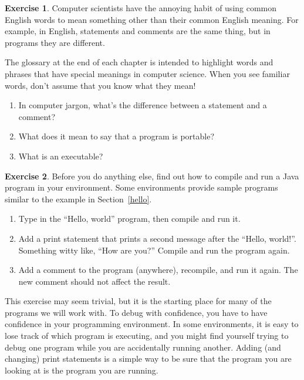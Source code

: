 \documentclass[12pt]{book}
\theoremstyle{definition}
\newtheorem{excz}{Exercise}[chapter]
\newenvironment{exercise}{\bigskip\begin{excz}\mbox{}}{\end{excz}}
\begin{document}
\begin{exercise}

Computer scientists have the annoying habit of using common
English words to mean something other than their common
English meaning.  For example, in English, statements and
comments are the same thing, but in programs they are different.

The glossary at the end of each chapter is intended to highlight
words and phrases that have special meanings in computer science.
When you see familiar words, don't assume that you know what 
they mean!

\begin{enumerate}

\item In computer jargon, what's the difference between a statement
and a comment?

\item What does it mean to say that a program is portable?

\item What is an executable?

\end{enumerate}

\end{exercise}

\begin{exercise}

Before you do anything else, find out how to compile and run a Java
program in your environment.  Some environments provide sample programs
similar to the example in Section~\ref{hello}.

\begin{enumerate}

\item Type in the ``Hello, world'' program, then compile and run it.

\item Add a print statement that prints a second message after
the ``Hello, world!''.  Something witty like, ``How are you?''
Compile and run the program again.

\item Add a comment to the program (anywhere), recompile, and run
it again.  The new comment should not affect the result.

\end{enumerate}

This exercise may seem trivial, but it is the starting place for many
of the programs we will work with.  To debug with confidence,
you have to have confidence in your programming environment.  In some
environments, it is easy to lose track of which program is executing,
and you might find yourself trying to debug one program while you are
accidentally running another.  Adding (and changing) print statements
is a simple way to be sure that the program you are looking at is
the program you are running.

\end{exercise}
\end{document}
